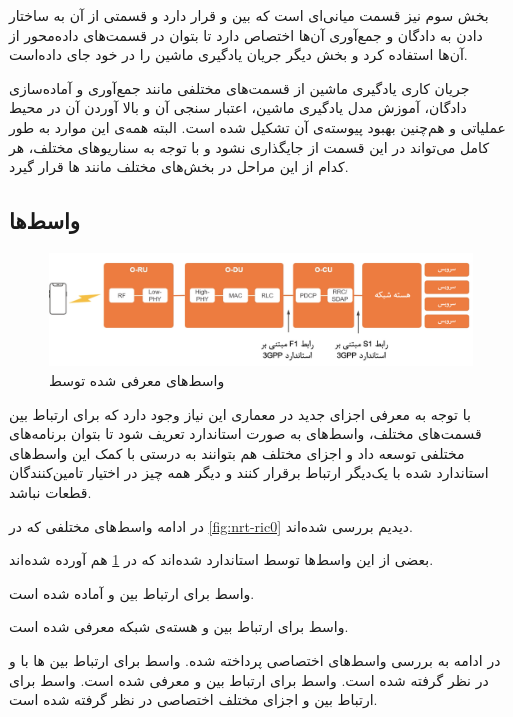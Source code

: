 \documentclass{CSICC}
\begin{document}
بخش سوم نیز قسمت میانی‌ای است که بین
و
قرار دارد و قسمتی از آن به ساختار دادن به دادگان و جمع‌آوری آن‌ها اختصاص دارد تا بتوان در قسمت‌های داده‌محور از آن‌ها استفاده کرد و بخش دیگر جریان یادگیری ماشین را در خود جای داده‌است.

جریان کاری یادگیری ماشین از قسمت‌های مختلفی مانند جمع‌آوری و آماده‌سازی دادگان، آموزش مدل یادگیری ماشین، اعتبار سنجی آن و بالا آوردن آن در محیط عملیاتی و هم‌چنین بهبود پیوسته‌ی آن تشکیل شده است. البته همه‌ی این موارد به طور کامل می‌تواند در این قسمت از 
جایگذاری نشود و با توجه به سناریوهای مختلف، هر کدام از این مراحل در بخش‌های مختلف 
مانند 
ها
قرار گیرد.

\subsection{واسط‌ها}

\begin{figure}
	\includegraphics[width=\linewidth]{Images/int1.png}
	\centering
	\caption{واسط‌های معرفی شده توسط
		}
	\label{fig:int1}
\end{figure}
با توجه به معرفی اجزای جدید در معماری 
این نیاز وجود دارد که برای ارتباط بین قسمت‌های مختلف، واسط‌های به صورت استاندارد تعریف شود تا بتوان برنامه‌های مختلفی توسعه داد و اجزای مختلف هم بتوانند به درستی با کمک این واسط‌های استاندارد شده با یک‌دیگر ارتباط برقرار کنند و دیگر همه چیز در اختیار تامین‌کنندگان قطعات نباشد.

در ادامه واسط‌های مختلفی که در 
\ref{fig:nrt-ric0}
 دیدیم بررسی شده‌اند.

بعضی از این واسط‌ها توسط 
استاندارد شده‌اند که در 
\ref{fig:int1}
هم آورده شده‌اند. 

واسط
برای ارتباط بین
و
آماده شده است.

واسط
برای ارتباط بین
و هسته‌ی شبکه معرفی شده است. 

در ادامه به بررسی واسط‌های اختصاصی
پرداخته شده. واسط
برای ارتباط بین
ها
با 
و
در نظر گرفته شده است. واسط
برای ارتباط بین
و 
معرفی شده است. واسط
برای ارتباط بین
‌و اجزای مختلف اختصاصی 
در نظر گرفته شده است.
\end{document}
